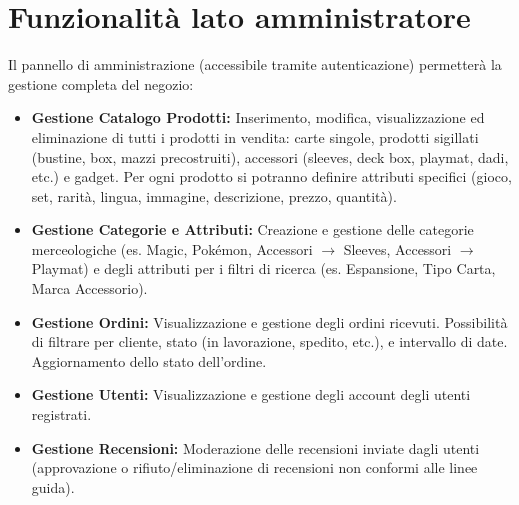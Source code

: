 \documentclass[14pt]{extreport}
\begin{document}
\section{Funzionalità lato amministratore}
Il pannello di amministrazione (accessibile tramite autenticazione) permetterà la gestione completa del negozio:
\begin{itemize}
    \item \textbf{Gestione Catalogo Prodotti:} Inserimento, modifica, visualizzazione ed eliminazione di tutti i prodotti in vendita: carte singole, prodotti sigillati (bustine, box, mazzi precostruiti), accessori (sleeves, deck box, playmat, dadi, etc.) e gadget. Per ogni prodotto si potranno definire attributi specifici (gioco, set, rarità, lingua, immagine, descrizione, prezzo, quantità).
    \item \textbf{Gestione Categorie e Attributi:} Creazione e gestione delle categorie merceologiche (es. Magic, Pokémon, Accessori $\rightarrow$ Sleeves, Accessori $\rightarrow$ Playmat) e degli attributi per i filtri di ricerca (es. Espansione, Tipo Carta, Marca Accessorio).
    \item \textbf{Gestione Ordini:} Visualizzazione e gestione degli ordini ricevuti. Possibilità di filtrare per cliente, stato (in lavorazione, spedito, etc.), e intervallo di date. Aggiornamento dello stato dell'ordine.
    \item \textbf{Gestione Utenti:} Visualizzazione e gestione degli account degli utenti registrati.
    \item \textbf{Gestione Recensioni:} Moderazione delle recensioni inviate dagli utenti (approvazione o rifiuto/eliminazione di recensioni non conformi alle linee guida).
\end{itemize}
\end{document}
